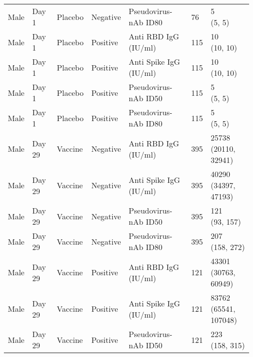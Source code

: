 \documentclass[]{book}
\theoremstyle{definition}
\theoremstyle{definition}
\theoremstyle{definition}
\newcommand{\1}{\mathbbm{1}}
\begin{document}
\begin{landscape}
\begin{ThreePartTable}
\begin{longtable}[t]{>{\raggedright\arraybackslash}p{7cm}llllll}
\hspace{1em}Male & Day 1 & Placebo & Negative & Pseudovirus-nAb ID80 & 76 & \makecell[l]{5\\(5, 5)}\\
\hspace{1em}Male & Day 1 & Placebo & Positive & Anti RBD IgG (IU/ml) & 115 & \makecell[l]{10\\(10, 10)}\\
\hspace{1em}Male & Day 1 & Placebo & Positive & Anti Spike IgG (IU/ml) & 115 & \makecell[l]{10\\(10, 10)}\\
\hspace{1em}Male & Day 1 & Placebo & Positive & Pseudovirus-nAb ID50 & 115 & \makecell[l]{5\\(5, 5)}\\
\hspace{1em}Male & Day 1 & Placebo & Positive & Pseudovirus-nAb ID80 & 115 & \makecell[l]{5\\(5, 5)}\\
\hspace{1em}Male & Day 29 & Vaccine & Negative & Anti RBD IgG (IU/ml) & 395 & \makecell[l]{25738\\(20110, 32941)}\\
\hspace{1em}Male & Day 29 & Vaccine & Negative & Anti Spike IgG (IU/ml) & 395 & \makecell[l]{40290\\(34397, 47193)}\\
\hspace{1em}Male & Day 29 & Vaccine & Negative & Pseudovirus-nAb ID50 & 395 & \makecell[l]{121\\(93, 157)}\\
\hspace{1em}Male & Day 29 & Vaccine & Negative & Pseudovirus-nAb ID80 & 395 & \makecell[l]{207\\(158, 272)}\\
\hspace{1em}Male & Day 29 & Vaccine & Positive & Anti RBD IgG (IU/ml) & 121 & \makecell[l]{43301\\(30763, 60949)}\\
\hspace{1em}Male & Day 29 & Vaccine & Positive & Anti Spike IgG (IU/ml) & 121 & \makecell[l]{83762\\(65541, 107048)}\\
\hspace{1em}Male & Day 29 & Vaccine & Positive & Pseudovirus-nAb ID50 & 121 & \makecell[l]{223\\(158, 315)}\\

\end{longtable}
\end{ThreePartTable}
\end{landscape}
\end{document}

